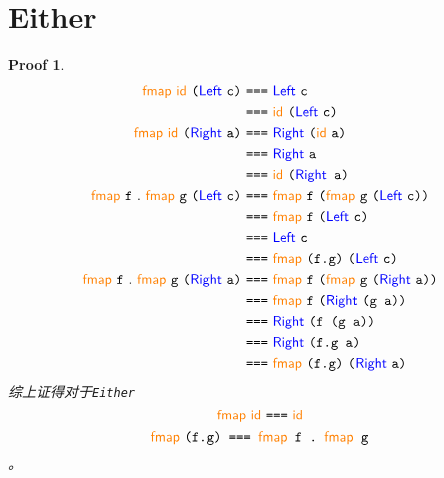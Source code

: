 \documentclass[UTF8]{article}
\newtheorem{Proof}{Proof}
\let\t\texttt
\newcommand{\kword}[1]{{\color{blue} \textsf{#1}}}
\newcommand{\func}[1]{{\color{orange} \textsf{#1}}}
\newcommand{\Left}{\kword{Left}}
\newcommand{\Right}{\kword{Right}}
\newcommand{\id}{\func{id}}
\newcommand{\fmap}{\func{fmap}}
\newcommand{\eq}{\t{===}}
\newcommand{\lb}{\t{(}}
\newcommand{\rb}{\t{)}}
\begin{document}
\section{Either}
    \begin{Proof}
        \begin{align}
            \fmap~\id~\lb\Left~\t{c}\rb~&\eq~\Left~\t{c} \notag \\
            &\eq~\id~\lb\Left~\t{c}\rb  \notag \\
            \fmap~\id~\lb\Right~\t{a}\rb~&\eq~\Right~\lb\id~\t{a}\rb \notag \\
            &\eq~\Right~\t{a} \notag \\
            &\eq~\id~\t{(\Right~\t{a})} \notag \\
            \fmap~\t{f}~.~\fmap~\t{g}~\lb\Left~\t{c}\rb~&\eq~\fmap~\t{f}~\lb\fmap~\t{g}~\lb\Left~\t{c}\rb\rb \notag \\
            &\eq~\fmap~\t{f}~\lb\Left~\t{c}\rb \notag \\
            &\eq~\Left~\t{c} \notag \\
            &\eq~\fmap~\t{(f.g)}~\lb\Left~\t{c}\rb \notag \\
            \fmap~\t{f}~.~\fmap~\t{g}~\lb\Right~\t{a}\rb~&\eq~\fmap~\t{f}~\lb\fmap~\t{g}~\lb\Right~\t{a}\rb\rb \notag \\
            &\eq~\fmap~\t{f}~\lb\Right~\t{(g~a)}\rb \notag \\
            &\eq~\Right~\lb \t{f~(g~a)} \rb \notag \\
            &\eq~\Right~\lb \t{f.g~a} \rb \notag \\
            &\eq~\fmap~\t{(f.g)}~\lb\Right~\t{a}\rb \notag
        \end{align}
        综上证得对于\texttt{Either} $$\fmap~\id~\eq~\id$$ $$\fmap~\t{(f.g)~\eq~\fmap~\t{f}~.~\fmap~\t{g}}$$。
    \end{Proof}
\end{document}
